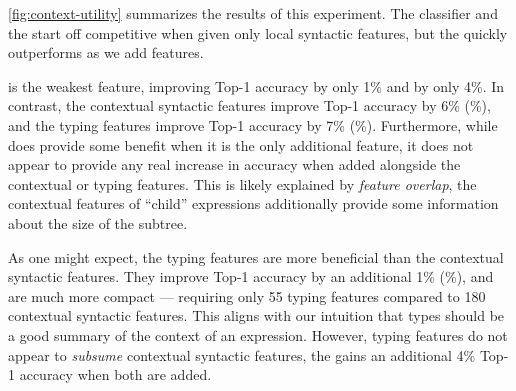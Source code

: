%
\autoref{fig:context-utility} summarizes the results of this experiment.
%
The \linear classifier and the \hiddenFH start off
competitive when given only local syntactic features, but the \hiddenFH
quickly outperforms as we add features.

\ExprSize is the weakest feature, improving \linear Top-1
accuracy by only 1\% and \hiddenFH by only 4\%.
%
In contrast, the contextual syntactic features improve \linear Top-1
accuracy by 6\% (\%), and the typing features improve
Top-1 accuracy by 7\% (\%).
%
Furthermore, while \ExprSize does provide some benefit when it is the
only additional feature, it does not appear to provide any real increase
in accuracy when added alongside the contextual or typing features.
%
This is likely explained by \emph{feature overlap}, \ie the contextual
features of ``child'' expressions additionally provide some information
about the size of the subtree.

As one might expect, the typing features are more beneficial than the
contextual syntactic features.
%
They improve Top-1 accuracy by an additional 1\% (\%), and are much more
compact --- requiring only 55 typing features compared to 180
contextual syntactic features.
%
This aligns with our intuition that types should be a good summary of
the context of an expression.
%
However, typing features do not appear to \emph{subsume} contextual
syntactic features, the \hiddenFH gains an additional 4\% Top-1 accuracy
when both are added.
